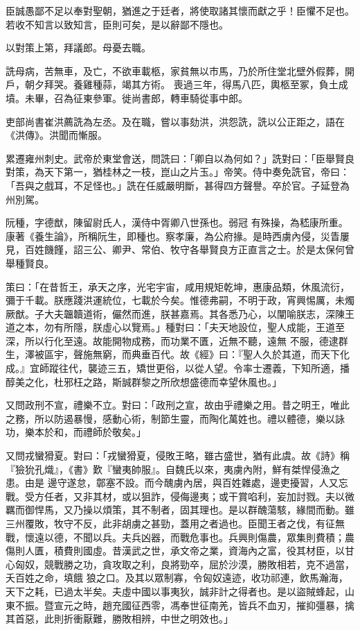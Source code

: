 \begin{pinyinscope}
 臣誠愚鄙不足以奉對聖朝，猶進之于廷者，將使取諸其懷而獻之乎！臣懼不足也。若收不知言以致知言，臣則可矣，是以辭鄙不隱也。



 以對策上第，拜議郎。母憂去職。



 詵母病，苦無車，及亡，不欲車載柩，家貧無以市馬，乃於所住堂北壁外假葬，開戶，朝夕拜哭。養雞種蒜，竭其方術。
 喪過三年，得馬八匹，輿柩至冢，負土成墳。未畢，召為征東參軍。徙尚書郎，轉車騎從事中郎。



 吏部尚書崔洪薦詵為左丞。及在職，嘗以事劾洪，洪怨詵，詵以公正距之，語在《洪傳》。洪聞而慚服。



 累遷雍州刺史。武帝於東堂會送，問詵曰：「卿自以為何如？」詵對曰：「臣舉賢良對策，為天下第一，猶桂林之一枝，崑山之片玉。」帝笑。侍中奏免詵官，帝曰：「吾與之戲耳，不足怪也。」詵在任威嚴明斷，甚得四方聲譽。卒於官。子延登為州別駕。



 阮種，字德猷，陳留尉氏人，漢侍中胥卿八世孫也。弱冠
 有殊操，為嵇康所重。康著《養生論》，所稱阮生，即種也。察孝廉，為公府掾。是時西虜內侵，災眚屢見，百姓饑饉，詔三公、卿尹、常伯、牧守各舉賢良方正直言之士。於是太保何曾舉種賢良。



 策曰：「在昔哲王，承天之序，光宅宇宙，咸用規矩乾坤，惠康品類，休風流衍，彌于千載。朕應踐洪運統位，七載於今矣。惟德弗嗣，不明于政，宵興惕厲，未燭厥猷。子大夫韞韥道術，儼然而進，朕甚嘉焉。其各悉乃心，以闡喻朕志，深陳王道之本，勿有所隱，朕虛心以覽焉。」種對曰：「夫天地設位，聖人成能，王道至深，所以行化至遠。故能開物成務，而功業不匱，近無不聽，遠無
 不服，德逮群生，澤被區宇，聲施無窮，而典垂百代。故《經》曰：『聖人久於其道，而天下化成。』宜師蹤往代，襲迹三五，矯世更俗，以從人望。令率士遷義，下知所適，播醇美之化，杜邪枉之路，斯誠群黎之所欣想盛德而幸望休風也。」



 又問政刑不宣，禮樂不立。對曰：「政刑之宣，故由乎禮樂之用。昔之明王，唯此之務，所以防遏暴慢，感動心術，制節生靈，而陶化萬姓也。禮以體德，樂以詠功，樂本於和，而禮師於敬矣。」



 又問戎蠻猾夏。對曰：「戎蠻猾夏，侵敗王略，雖古盛世，猶有此虞。故《詩》稱『獫狁孔熾』，《書》歎『蠻夷帥服』。自魏氏以來，夷虜內附，鮮有桀悍侵漁之患。由是
 邊守遂怠，鄣塞不設。而今醜虜內居，與百姓雜處，邊吏擾習，人又忘戰。受方任者，又非其材，或以狙詐，侵侮邊夷；或干賞啗利，妄加討戮。夫以微羈而御悍馬，又乃操以煩策，其不制者，固其理也。是以群醜蕩駭，緣間而動。雖三州覆敗，牧守不反，此非胡虜之甚勁，蓋用之者過也。臣聞王者之伐，有征無戰，懷遠以德，不聞以兵。夫兵凶器，而戰危事也。兵興則傷農，眾集則費積；農傷則人匱，積費則國虛。昔漢武之世，承文帝之業，資海內之富，役其材臣，以甘心匈奴，競戰勝之功，貪攻取之利，良將勁卒，屈於沙漠，勝敗相若，克不過當，夭百姓之命，填餓
 狼之口。及其以眾制寡，令匈奴遠迹，收功祁連，飲馬瀚海，天下之耗，已過太半矣。夫虛中國以事夷狄，誠非計之得者也。是以盜賊蜂起，山東不振。暨宣元之時，趙充國征西零，馮奉世征南羌，皆兵不血刃，摧抑彊暴，擒其首惡，此則折衝厭難，勝敗相辨，中世之明效也。」




\end{pinyinscope}
